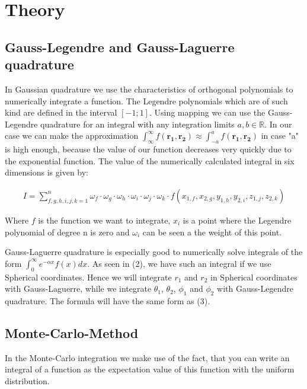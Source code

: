 \documentclass[10pt,a4paper]{article}
\begin{document}
\section{Theory}
\subsection{Gauss-Legendre and Gauss-Laguerre quadrature}

In Gaussian quadrature we use the characteristics of orthogonal polynomials to numerically integrate a function. The Legendre polynomials which are of such kind are defined in the interval $[-1;1]$. Using mapping we can use the Gauss-Legendre quadrature for an integral with any integration limits $a, b \in \mathbb{R}$. In our case we can make the approximation $\int_{\infty}^{\infty} f(\mathbf{r_1},\mathbf{r_2}) \approx \int_{-a}^{a} f(\mathbf{r_1},\mathbf{r_2})$ in case "a" is high enough, because the value of our function decreases very quickly due to the exponential function. The value of the numerically calculated integral in six dimensions is given by:

\begin{align}
I = \sum_{f,g,h,i,j,k = 1}^{n}\omega_f \cdot \omega_g \cdot \omega_h \cdot \omega_i \cdot \omega_j \cdot \omega_k \cdot f(x_{1,f} , x_{2,g} , y_{1,h} , y_{2,i} , z_{1,j} , z_{2,k})  
\end{align}

Where $f$ is the function we want to integrate, $x_i$ is a point where the Legendre polynomial of degree n is zero and $\omega_i$ can be seen a the weight of this point.

Gauss-Laguerre quadrature is especially good to numerically solve integrals of the form $\int_{0}^{\infty} e^{-\alpha x} f(x) dx$. As seen in (2), we have such an integral if we use Spherical coordinates. Hence we will integrate $r_1$ and $r_2$ in Spherical coordinates with Gauss-Laguerre, while we integrate $\theta_1$, $\theta_2$, $\phi_1$ and $\phi_2$ with Gauss-Legendre quadrature. The formula will have the same form as (3).

\subsection{Monte-Carlo-Method} 

In the Monte-Carlo integration we make use of the fact, that you can write an integral of a function as the expectation value of this function with the uniform distribution.
\end{document}
